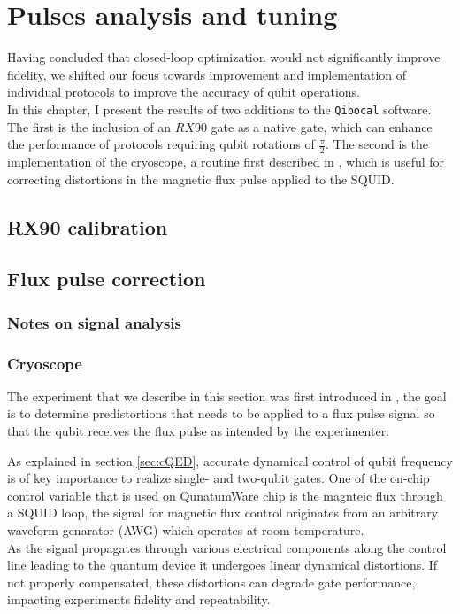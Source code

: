 \chapter{Pulses analysis and tuning}

Having concluded that closed-loop optimization would not significantly improve fidelity, we shifted our focus towards improvement and implementation of individual protocols to improve the accuracy of qubit operations.\\
In this chapter, I present the results of two additions to the \texttt{Qibocal} software. 
The first is the inclusion of an $RX90$ gate as a native gate, which can enhance the performance of protocols requiring qubit rotations of $\frac{\pi}{2}$.
The second is the implementation of the cryoscope, a routine first described in \cite{rol_time-domain_2020}, which is useful for correcting distortions in the magnetic flux pulse applied to the SQUID.

\section{RX90 calibration}



\section{Flux pulse correction}
\subsection{Notes on signal analysis}


\subsection{Cryoscope}
The experiment that we describe in this section was first introduced in \cite{rol_time-domain_2020}, the goal is to determine predistortions that needs to be applied to a flux pulse signal so that the qubit receives the flux pulse as intended by the experimenter.

As explained in section \ref{sec:cQED}, accurate dynamical control of qubit frequency is of key importance to realize single- and two-qubit gates.
One of the on-chip control variable that is used on QunatumWare chip is the magnteic flux through a SQUID loop, the signal for magnetic flux control originates from an arbitrary waveform genarator (AWG) which operates at room temperature.\\
As the signal propagates through various electrical components along the control line leading to the quantum device it undergoes linear dynamical distortions. 
If not properly compensated, these distortions can degrade gate performance, impacting experiments fidelity and repeatability.\\

